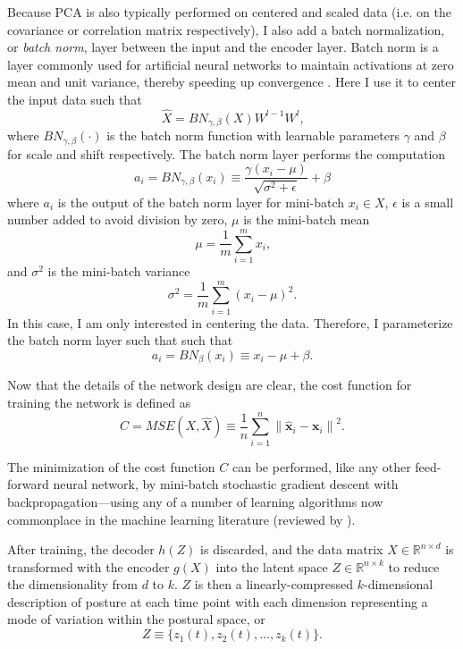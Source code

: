\documentclass[11pt,a4paper,oneside]{article}
\newcommand{\norm}[1]{\left\lVert#1\right\rVert}
\begin{document}
\begin{appendices}
\par
Because PCA is also typically performed on centered and scaled data (i.e. on the covariance or correlation matrix respectively), I also add a batch normalization, or \textit{batch norm}, layer between the input and the encoder layer. Batch norm is a layer commonly used for artificial neural networks to maintain activations at zero mean and unit variance, thereby speeding up convergence \citep{ioffe2015batch}. Here I use it to center the input data such that 
\begin{equation}
\hat{X} = \mathit{BN}_{\gamma,\beta}(X)W^{l-1}W^l \text{,}
\end{equation}
where $\mathit{BN}_{\gamma,\beta}(\cdot)$ is the batch norm function with learnable parameters $\gamma$ and $\beta$ for scale and shift respectively. The batch norm layer performs the computation
\begin{equation}
a_i = \mathit{BN}_{\gamma,\beta}(x_i)  \equiv \frac{\gamma (x_i - \mu)}{\sqrt{\sigma^2+ \epsilon}} + \beta 
\end{equation}
where $a_i$ is the output of the batch norm layer for mini-batch $x_i \in X$, $\epsilon$ is a small number added to avoid division by zero, $\mu$ is the mini-batch mean
\begin{equation}
\mu = \frac{1}{m} \sum_{i=1}^{m}x_i\text{,}
\end{equation}
 and $\sigma^2$ is the mini-batch variance
 \begin{equation}
 \sigma^2 = \frac{1}{m} \sum_{i=1}^{m}(x_i-\mu)^2 \text{.}
 \end{equation}
In this case, I am only interested in centering the data. Therefore, I parameterize the batch norm layer such that such that 
\begin{equation}
a_i = \mathit{BN}_{\beta}(x_i) \equiv x_i -  \mu + \beta  \text{.} 
\end{equation}
\par
Now that the details of the network design are clear, the cost function for training the network is defined as 
\begin{equation}
C = \mathit{MSE}(X,\hat{X}) \equiv \frac{1}{n} \sum_{i=1}^{n} \norm{\mathbf{\hat{x}}_i -\mathbf{x}_i}^2 \text{.}
\end{equation}

The minimization of the cost function $C$ can be performed, like any other feed-forward neural network, by mini-batch stochastic gradient descent with backpropagation---using any of a number of learning algorithms now commonplace in the machine learning literature (reviewed by \citealt{ruder2016}). 
\par
After training, the decoder $h(Z)$ is discarded, and the data matrix $X \in \mathbb{R}^{n\times d}$ is transformed with the encoder $g(X)$ into the latent space $Z  \in \mathbb{R}^{n\times k}$ to reduce the dimensionality from $d$ to $k$. $Z$ is then a linearly-compressed $k$-dimensional description of posture at each time point with each dimension representing a mode of variation within the postural space, or 
\begin{equation}
Z \equiv \{z_1(t),z_2(t),\ldots,z_k(t)\} \text{.}
\end{equation}


\end{appendices}
\end{document}
